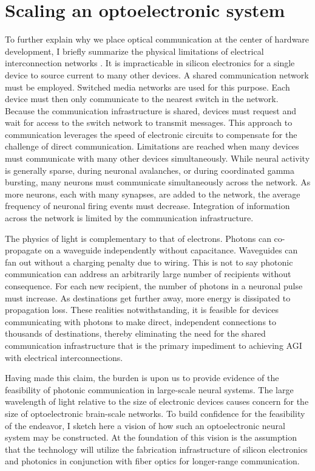 \documentclass[twocolumn]{article}
\begin{document}
{\section{\label{sec:communication}Scaling an optoelectronic system}
To further explain why we place optical communication at the center of hardware development, I briefly summarize the physical limitations of electrical interconnection networks \cite{hepa2012}. It is impracticable in silicon electronics for a single device to source current to many other devices. A shared communication network must be employed. Switched media networks are used for this purpose. Each device must then only communicate to the nearest switch in the network. Because the communication infrastructure is shared, devices must request and wait for access to the switch network to transmit messages. This approach to communication leverages the speed of electronic circuits to compensate for the challenge of direct communication. Limitations are reached when many devices must communicate with many other devices simultaneously. While neural activity is generally sparse, during neuronal avalanches, or during coordinated gamma bursting, many neurons must communicate simultaneously across the network. As more neurons, each with many synapses, are added to the network, the average frequency of neuronal firing events must decrease. Integration of information across the network is limited by the communication infrastructure.

The physics of light is complementary to that of electrons. Photons can co-propagate on a waveguide independently without capacitance. Waveguides can fan out without a charging penalty due to wiring. This is not to say photonic communication can address an arbitrarily large number of recipients without consequence. For each new recipient, the number of photons in a neuronal pulse must increase. As destinations get further away, more energy is dissipated to propagation loss. These realities notwithstanding, it is feasible for devices communicating with photons to make direct, independent connections to thousands of destinations, thereby eliminating the need for the shared communication infrastructure that is the primary impediment to achieving AGI with electrical interconnections.

Having made this claim, the burden is upon us to provide evidence of the feasibility of photonic communication in large-scale neural systems. The large wavelength of light relative to the size of electronic devices causes concern for the size of optoelectronic brain-scale networks. To build confidence for the feasibility of the endeavor, I sketch here a vision of how such an optoelectronic neural system may be constructed. At the foundation of this vision is the assumption that the technology will utilize the fabrication infrastructure of silicon electronics and photonics in conjunction with fiber optics for longer-range communication. 

}
\end{document}

